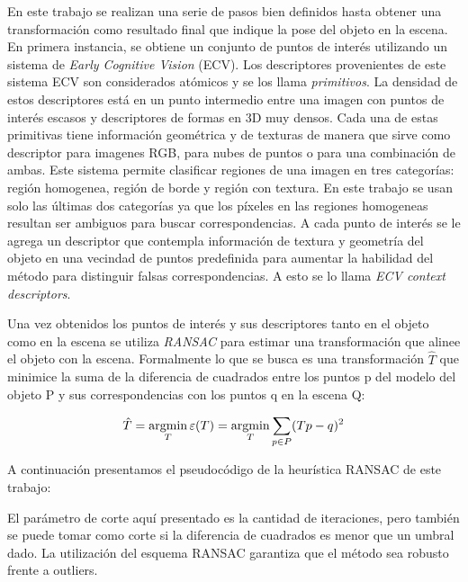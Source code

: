 En este trabajo se realizan una serie de pasos bien definidos hasta obtener una transformación como resultado final que indique la pose del objeto en la escena. En primera instancia, se obtiene un conjunto de puntos de interés utilizando un sistema de \textit{Early Cognitive Vision} (ECV). Los descriptores provenientes de este sistema ECV son considerados atómicos y se los llama \textit{primitivos}. La densidad de estos descriptores está en un punto intermedio entre una imagen con puntos de interés escasos y descriptores de formas en 3D muy densos. Cada una de estas primitivas tiene información geométrica y de texturas de manera que sirve como descriptor para imagenes RGB, para nubes de puntos o para una combinación de ambas. Este sistema permite clasificar regiones de una imagen en tres categorías: región homogenea, región de borde y región con textura. En este trabajo se usan solo las últimas dos categorías ya que los píxeles en las regiones homogeneas resultan ser ambiguos para buscar correspondencias.
A cada punto de interés se le agrega un descriptor que contempla información de textura y geometría del objeto en una vecindad de puntos predefinida para aumentar la habilidad del método para distinguir falsas correspondencias. A esto se lo llama \textit{ECV context descriptors}.

Una vez obtenidos los puntos de interés y sus descriptores tanto en el objeto como en la escena se utiliza \textit{RANSAC} \cite{ransac} para estimar una transformación que alinee el objeto con la escena. Formalmente lo que se busca es una transformación $\hat{T}$ que minimice la suma de la diferencia de cuadrados entre los puntos p del modelo del objeto P y sus correspondencias con los puntos q en la escena Q:

\begin{equation}\label{eq:mindif}
\hat{T} = \operatorname*{argmin}_T \varepsilon(T) = \operatorname*{argmin}_T \sum_{p \in P}(Tp - q)^2
\end{equation}

A continuación presentamos el pseudocódigo de la heurística RANSAC de este trabajo:
\footnotesize

\normalsize

El parámetro de corte aquí presentado es la cantidad de iteraciones, pero también se puede tomar como corte si la diferencia de cuadrados es menor que un umbral dado. La utilización del esquema RANSAC garantiza que el método sea robusto frente a outliers.


